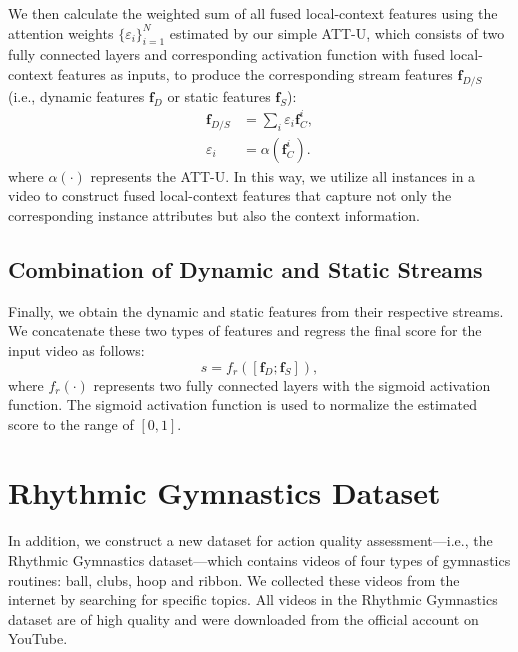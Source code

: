 \documentclass[sigconf]{acmart}
\begin{document}
We then calculate the weighted sum of all fused local-context features using the attention weights $\{\varepsilon_i\}_{i=1}^N$ estimated by our simple ATT-U, which consists of two fully connected layers and corresponding activation function with fused local-context features as inputs, to produce the corresponding stream features $\mathbf{f}_{D/S}$ (i.e., dynamic features $\mathbf{f}_{D}$ or static features $\mathbf{f}_{S}$):
\begin{equation}
\begin{aligned}
\mathbf{f}_{D/S} &= \sum_{i}{\varepsilon_i\mathbf{f}_{C}^{i}},\\
\varepsilon_{i} &= \alpha(\mathbf{f}_{C}^{i}).
\end{aligned}
\end{equation}
where $\alpha(\cdot)$ represents the ATT-U. In this way, we utilize all instances in a video to construct fused local-context features that capture not only the corresponding instance attributes but also the context information.

\vspace{-0.1cm}
\subsection{Combination of Dynamic and Static Streams}
Finally, we obtain the dynamic and static features from their respective streams. We concatenate these two types of features and regress the final score for the input video as follows:
\begin{equation} \label{eq:predict}
s = f_r([\mathbf{f}_{D}; \mathbf{f}_{S}]),
\end{equation}
where $f_r(\cdot)$ represents two fully connected layers with the sigmoid activation function. The sigmoid activation function is used to normalize the estimated score to the range of $[0, 1]$.

\vspace{-0.1cm}
\section{Rhythmic Gymnastics Dataset}


In addition, we construct a new dataset for action quality assessment---i.e., the Rhythmic Gymnastics dataset---which contains videos of four types of gymnastics routines: ball, clubs, hoop and ribbon. We collected these videos from the internet by searching for specific topics. All videos in the Rhythmic Gymnastics dataset are of high quality and were downloaded from the official account on YouTube.
\end{document}
